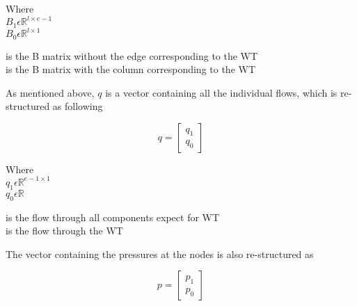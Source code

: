 \begin{minipage}[t]{0.20\textwidth}
Where\\
\hspace*{8mm} $B_1 \epsilon \mathbb{R}^{l \times e-1}$  \\
\hspace*{8mm} $B_0 \epsilon \mathbb{R}^{l \times 1} $ 
\end{minipage}
\begin{minipage}[t]{0.68\textwidth}
\vspace*{2mm}
\hspace*{4mm} is the B matrix without the edge corresponding to the WT\\
\hspace*{4mm} is the B matrix with the column corresponding to the WT 
\end{minipage}

As mentioned above, $q$ is a vector containing all the individual flows, which 
is re-structured as following

\begin{equation}
q =
\begin{bmatrix}
         q_1 \\
	q_0 
\end{bmatrix}
\label{qmatrix}
\end{equation}

\begin{minipage}[t]{0.20\textwidth}
Where\\
\hspace*{8mm} $q_1 \epsilon \mathbb{R}^{e-1 \times 1}$  \\
\hspace*{8mm} $q_0 \epsilon \mathbb{R} $ 
\end{minipage}
\begin{minipage}[t]{0.68\textwidth}
\vspace*{2mm}
\hspace*{4mm} is the flow through all components expect for WT\\
\hspace*{4mm} is the flow through the WT 
\end{minipage}

The vector containing the pressures at the nodes is also re-structured as

\begin{equation}
p =
\begin{bmatrix}
         p_1 \\
	p_0 
\end{bmatrix}
\end{equation}

